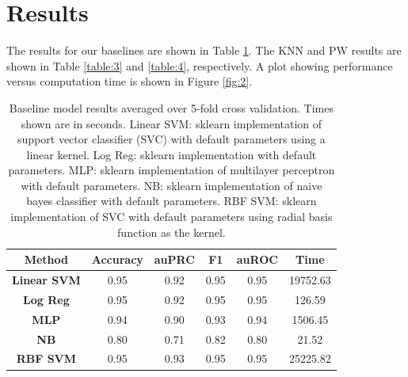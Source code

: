 \documentclass[12pt]{article}
\begin{document}
	

	\section{Results}
	
    The results for our baselines are shown in Table \ref{table:2}. The KNN and PW results are shown in Table \ref{table:3} and \ref{table:4}, respectively. A plot showing performance versus computation time is shown in Figure \ref{fig:2}.
    
    \begin{table}[]
    \centering
    \begin{tabular}{|c|c|c|c|c|c|}
    \hline
    \textbf{Method} & \textbf{Accuracy} & \textbf{auPRC} & \textbf{F1} &                             \textbf{auROC} & \textbf{Time} \\ \hline
    \textbf{Linear SVM} & 0.95 & 0.92 & 0.95 & 0.95 & 19752.63 \\ \hline
    \textbf{Log Reg}    & 0.95 & 0.92 & 0.95 & 0.95 & 126.59   \\ \hline
    \textbf{MLP}        & 0.94 & 0.90 & 0.93 & 0.94 & 1506.45  \\ \hline
    \textbf{NB}         & 0.80 & 0.71 & 0.82 & 0.80 & 21.52    \\ \hline
    \textbf{RBF SVM}    & 0.95 & 0.93 & 0.95 & 0.95 & 25225.82 \\ \hline
    \end{tabular}
    \caption{Baseline model results averaged over 5-fold cross validation. Times shown are in seconds. Linear SVM: sklearn implementation of support vector classifier (SVC) with default parameters using a linear kernel. Log Reg: sklearn implementation with default parameters. MLP: sklearn implementation of multilayer perceptron with default parameters. NB: sklearn implementation of naive bayes classifier with default parameters. RBF SVM: sklearn implementation of SVC with default parameters using radial basis function as the kernel.}
    \label{table:2}
    \end{table} 
    
\end{document}
